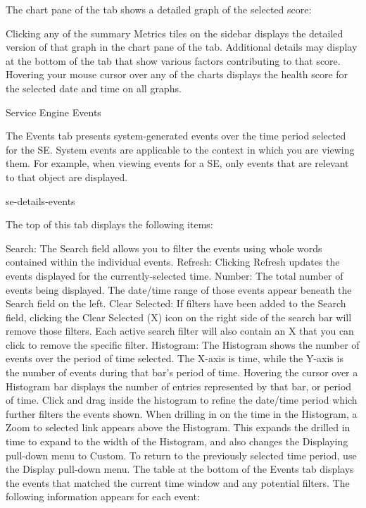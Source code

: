 \documentclass[letterpaper,10pt,english]{sphinxmanual}
\begin{document}
The chart pane of the tab shows a detailed graph of the selected score:

Clicking any of the summary Metrics tiles on the sidebar displays the detailed version of that graph in the chart pane of the tab. Additional details may display at the bottom of the tab that show various factors contributing to that score.
Hovering your mouse cursor over any of the charts displays the health score for the selected date and time on all graphs.

Service Engine Events

The Events tab presents system-generated events over the time period selected for the SE. System events are applicable to the context in which you are viewing them. For example, when viewing events for a SE, only events that are relevant to that object are displayed.

se-details-events

The top of this tab displays the following items:

Search: The Search field allows you to filter the events using whole words contained within the individual events.
Refresh: Clicking Refresh updates the events displayed for the currently-selected time.
Number: The total number of events being displayed. The date/time range of those events appear beneath the Search field on the left.
Clear Selected: If filters have been added to the Search field, clicking the Clear Selected (X) icon on the right side of the search bar will remove those filters. Each active search filter will also contain an X that you can click to remove the specific filter.
Histogram: The Histogram shows the number of events over the period of time selected. The X-axis is time, while the Y-axis is the number of events during that bar’s period of time.
Hovering the cursor over a Histogram bar displays the number of entries represented by that bar, or period of time.
Click and drag inside the histogram to refine the date/time period which further filters the events shown. When drilling in on the time in the Histogram, a Zoom to selected link appears above the Histogram. This expands the drilled in time to expand to the width of the Histogram, and also changes the Displaying pull-down menu to Custom. To return to the previously selected time period, use the Display pull-down menu.
The table at the bottom of the Events tab displays the events that matched the current time window and any potential filters. The following information appears for each event:
\end{document}
